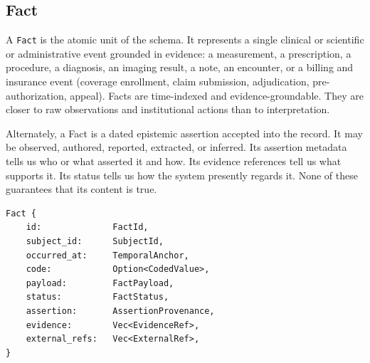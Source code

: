 \documentclass[11pt]{article}
\begin{document}
\begin{center}
\end{center}

\subsection{Fact}
\label{sec:entities}

A \texttt{Fact} is the atomic unit of the schema. It represents a single
clinical or scientific or administrative event grounded in evidence: a measurement, a
prescription, a procedure, a diagnosis, an imaging result, a note, an
encounter, or a billing and insurance event (coverage enrollment, claim
submission, adjudication, pre-authorization, appeal). Facts are time-indexed
and evidence-groundable. They are closer to raw observations and institutional
actions than to interpretation.

Alternately, a Fact is a dated epistemic assertion accepted
into the record. It may be observed, authored, reported, extracted, or inferred.
Its assertion metadata tells us who or what asserted it and how. Its evidence
references tell us what supports it. Its status tells us how the system presently
regards it. None of these guarantees that its content is true.

\begin{lstlisting}
Fact {
    id:              FactId,
    subject_id:      SubjectId,
    occurred_at:     TemporalAnchor,
    code:            Option<CodedValue>,
    payload:         FactPayload,
    status:          FactStatus,
    assertion:       AssertionProvenance,
    evidence:        Vec<EvidenceRef>,
    external_refs:   Vec<ExternalRef>,
}
\end{lstlisting}
\end{document}

